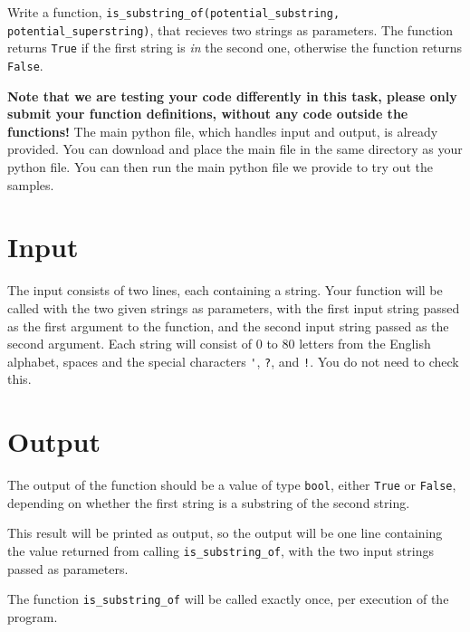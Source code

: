 
Write a function, \texttt{is\_substring\_of(potential\_substring, potential\_superstring)},
that recieves two strings as parameters.
The function returns \texttt{True} if the first string is \emph{in} the second one,
otherwise the function returns \texttt{False}.

\textbf{Note that we are testing your code differently in this task,
please only submit your function definitions, without any code outside the functions!}
The main python file, which handles input and output, is already provided.
You can download and place the main file in the same directory as your python file.
You can then run the main python file we provide to try out the samples.

\section*{Input}
The input consists of two lines, each containing a string.
Your function will be called with the two given strings as parameters,
with the first input string passed as the first argument to the function,
and the second input string passed as the second argument.
Each string will consist of $0$ to $80$ letters from the English alphabet,
spaces and the special characters \texttt{\'}, \texttt{?}, and \texttt{!}.
You do not need to check this.

\section*{Output}
The output of the function should be a value of type \texttt{bool},
either \texttt{True} or \texttt{False},
depending on whether the first string is a substring of the second string.

This result will be printed as output, so
the output will be one line containing the value returned from calling \texttt{is\_substring\_of},
with the two input strings passed as parameters.

The function \texttt{is\_substring\_of} will be called exactly once, per execution of the program.
